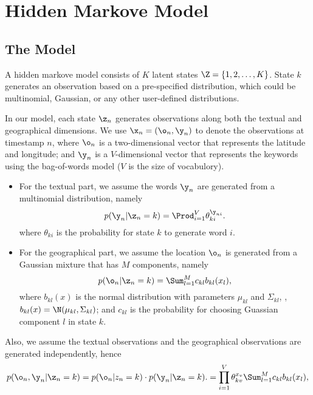 
\section{Hidden Markove Model}

\subsection{The Model}

A hidden markove model consists of $K$ latent states $\Z = \{1, 2, \ldots,
K\}$. State $k$ generates an observation based on a pre-specified distribution,
which could be multinomial, Gaussian, or any other user-defined distributions. 

In our model, each state $\z_n$ generates observations along both the textual
and geographical dimensions. We use $\x_n = (\o_n, \y_n)$ to denote the observations at
timestamp $n$, where $\o_n$ is a two-dimensional vector that represents the
latitude and longitude; and $\y_n$ is a $V$-dimensional vector that represents
the keywords using the bag-of-words model ($V$ is the size of vocabulory).

\begin{itemize}
  \item
    For the textual part, we assume the words $\y_n$ are generated from a
    multinomial distribution, namely
    $$
    p(\y_n | \z_n = k) = \Prod_{i=1}^V \theta_{ki}^{\y_{ni}}.
    $$
    where $\theta_{ki}$ is the probability for state $k$ to generate word $i$.

  \item
    For the geographical part, we assume the location $\o_n$ is generated from a Gaussian mixture
    that has $M$ components, namely
    $$
    p(\o_n | \z_n = k) = \Sum_{l=1}^M c_{kl} b_{kl}(x_l),
    $$
    where $b_{kl}(x)$ is the normal distribution with parameters $\mu_{kl}$ and $\Sigma_{kl}$, \ie,
    $b_{kl}(x) = \N(\mu_{kl}, \Sigma_{kl})$; and $c_{kl}$ is the probability for choosing Guassian component $l$ in state $k$.

\end{itemize}

Also, we assume the textual observations and the geographical observations are generated
independently, hence
$$
p(\o_n, \y_n | \z_n = k)  = p(\o_n | z_n = k) \cdot p(\y_n | \z_n = k).
= \prod_{i=1}^V \theta_{kv}^{x_v}   \Sum_{l=1}^M c_{kl} b_{kl}(x_l),
$$


